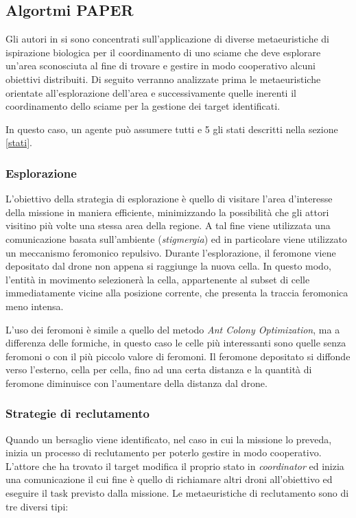 \subsection{Algortmi PAPER}

Gli autori in \cite{palmieri2017comparison} si sono concentrati sull'applicazione di diverse metaeuristiche di ispirazione biologica per il coordinamento di uno sciame che deve esplorare un'area sconosciuta al fine di trovare e gestire in modo cooperativo alcuni obiettivi distribuiti.
Di seguito verranno analizzate prima le metaeuristiche orientate all'esplorazione dell'area e successivamente quelle inerenti il coordinamento dello sciame per la gestione dei target identificati.

In questo caso, un agente può assumere tutti e 5 gli stati descritti nella sezione \ref{stati}.

\subsubsection{Esplorazione}

L'obiettivo della strategia di esplorazione è quello di visitare l'area d'interesse della missione in maniera efficiente, minimizzando la possibilità che gli attori visitino più volte una stessa area della regione.
A tal fine viene utilizzata una comunicazione basata sull'ambiente (\textit{stigmergia}) ed in particolare viene utilizzato un meccanismo feromonico repulsivo.
Durante l'esplorazione, il feromone viene depositato dal drone non appena si raggiunge la nuova cella. 
In questo modo, l'entità in movimento selezionerà la cella, appartenente al subset di celle immediatamente vicine alla posizione corrente, che presenta la traccia feromonica meno intensa.

L'uso dei feromoni è simile a quello del metodo \textit{Ant Colony Optimization}, ma a differenza delle formiche, in questo caso le celle più interessanti sono quelle senza feromoni o con il più piccolo valore di feromoni. 
Il feromone depositato si diffonde verso l'esterno, cella per cella, fino ad una certa distanza  e la quantità di feromone diminuisce con l'aumentare della distanza dal drone.


\subsubsection{Strategie di reclutamento}

Quando un bersaglio viene identificato, nel caso in cui la missione lo preveda, inizia un processo di reclutamento per poterlo gestire in modo cooperativo.
L'attore che ha trovato il target modifica il proprio stato in \textit{coordinator} ed inizia una comunicazione il cui fine è quello di richiamare altri droni all'obiettivo ed eseguire il task previsto dalla missione. 
Le metaeuristiche di reclutamento sono di tre diversi tipi:

